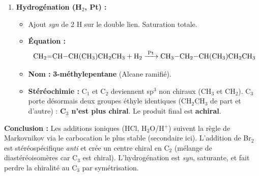 \documentclass[11pt]{article}
\begin{document}
\begin{exoresolu}
\begin{enumerate}
    \item \textbf{Hydrogénation (H$_2$, Pt) :}
    \begin{itemize}
        \item Ajout \textit{syn} de 2 H sur le double lien. Saturation totale.
        \item \textbf{Équation :} 
        \[ \ce{CH2=CH-CH(CH3)CH2CH3 + H2 ->[Pt] CH3-CH2-CH(CH3)CH2CH3} \]
        \item \textbf{Nom :} \textbf{3-méthylepentane} (Alcane ramifié). 
        \item \textbf{Stéréochimie :} C$_1$ et C$_2$ deviennent sp$^3$ non chiraux (CH$_3$ et CH$_2$). C$_3$ porte désormais deux groupes éthyle identiques (CH$_2$CH$_3$ de part et d'autre) : \textbf{C$_3$ n'est plus chiral}. Le produit final est \textbf{achiral}.
    \end{itemize}
\end{enumerate}

\textbf{Conclusion :} Les additions ioniques (HCl, H$_2$O/H$^+$) suivent la règle de Markovnikov via le carbocation le plus stable (secondaire ici). L'addition de Br$_2$ est stéréospécifique \textit{anti} et crée un centre chiral en C$_2$ (mélange de diastéréoisomères car C$_3$ est chiral). L'hydrogénation est \textit{syn}, saturante, et fait perdre la chiralité au C$_3$ par symétrisation.
\end{exoresolu}
\end{document}
